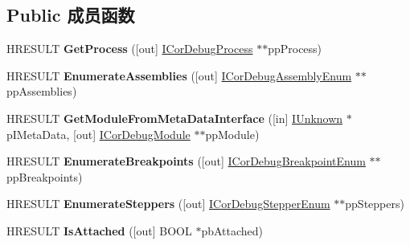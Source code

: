 \subsection*{Public 成员函数}
\begin{DoxyCompactItemize}
\item 
\mbox{\label{interface_i_cor_debug_app_domain_ae35306b73f77ec05b05d67ca46bdaccb}} 
H\+R\+E\+S\+U\+LT {\bfseries Get\+Process} (\mbox{[}out\mbox{]} \hyperlink{interface_i_cor_debug_process}{I\+Cor\+Debug\+Process} $\ast$$\ast$pp\+Process)
\item 
\mbox{\label{interface_i_cor_debug_app_domain_a0d903de2aa17799bd9b0bbd766b41ac3}} 
H\+R\+E\+S\+U\+LT {\bfseries Enumerate\+Assemblies} (\mbox{[}out\mbox{]} \hyperlink{interface_i_cor_debug_assembly_enum}{I\+Cor\+Debug\+Assembly\+Enum} $\ast$$\ast$pp\+Assemblies)
\item 
\mbox{\label{interface_i_cor_debug_app_domain_a9a191b77f37638d84a035a836d3fed3a}} 
H\+R\+E\+S\+U\+LT {\bfseries Get\+Module\+From\+Meta\+Data\+Interface} (\mbox{[}in\mbox{]} \hyperlink{interface_i_unknown}{I\+Unknown} $\ast$p\+I\+Meta\+Data, \mbox{[}out\mbox{]} \hyperlink{interface_i_cor_debug_module}{I\+Cor\+Debug\+Module} $\ast$$\ast$pp\+Module)
\item 
\mbox{\label{interface_i_cor_debug_app_domain_ac1a6b7c014d9ce33cb96b0c829028b31}} 
H\+R\+E\+S\+U\+LT {\bfseries Enumerate\+Breakpoints} (\mbox{[}out\mbox{]} \hyperlink{interface_i_cor_debug_breakpoint_enum}{I\+Cor\+Debug\+Breakpoint\+Enum} $\ast$$\ast$pp\+Breakpoints)
\item 
\mbox{\label{interface_i_cor_debug_app_domain_a3824764a74ddf19753ebe77b4a660d34}} 
H\+R\+E\+S\+U\+LT {\bfseries Enumerate\+Steppers} (\mbox{[}out\mbox{]} \hyperlink{interface_i_cor_debug_stepper_enum}{I\+Cor\+Debug\+Stepper\+Enum} $\ast$$\ast$pp\+Steppers)
\item 
\mbox{\label{interface_i_cor_debug_app_domain_a972446057cd6ff0939a01ae9dc34333e}} 
H\+R\+E\+S\+U\+LT {\bfseries Is\+Attached} (\mbox{[}out\mbox{]} B\+O\+OL $\ast$pb\+Attached)
\item 
$$
\end{DoxyCompactItemize}
